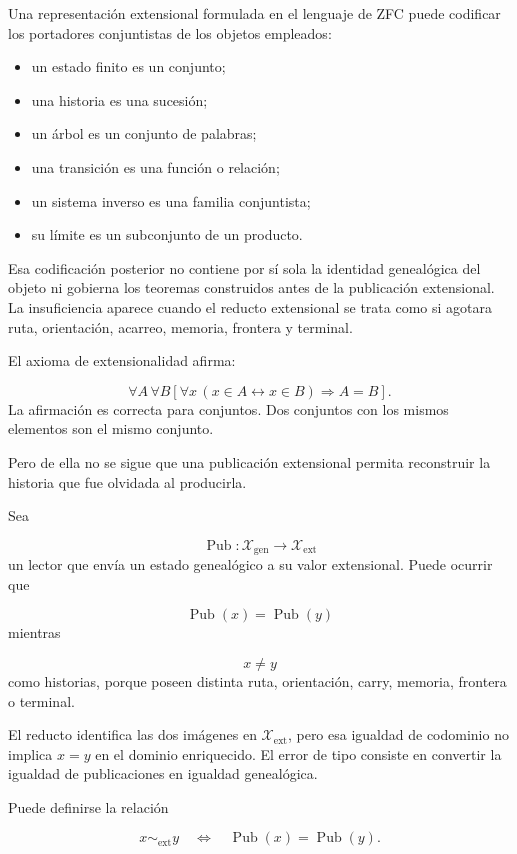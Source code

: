 Una representación extensional formulada en el lenguaje de ZFC puede codificar los portadores conjuntistas de los objetos empleados:\par
\begin{itemize}
\item un estado finito es un conjunto;
\item una historia es una sucesión;
\item un árbol es un conjunto de palabras;
\item una transición es una función o relación;
\item un sistema inverso es una familia conjuntista;
\item su límite es un subconjunto de un producto.
\end{itemize}
Esa codificación posterior no contiene por sí sola la identidad genealógica del objeto ni gobierna los teoremas construidos antes de la publicación extensional. La insuficiencia aparece cuando el reducto extensional se trata como si agotara ruta, orientación, acarreo, memoria, frontera y terminal.\par
El axioma de extensionalidad afirma:\par
\[
\forall A\,\forall B
\left[
\forall x\,
(x\in A\leftrightarrow x\in B)
\Rightarrow A=B
\right].
\]
La afirmación es correcta para conjuntos. Dos conjuntos con los mismos elementos son el mismo conjunto.\par
Pero de ella no se sigue que una publicación extensional permita reconstruir la historia que fue olvidada al producirla.\par
Sea\par
\[
\operatorname{Pub}:
\mathscr X_{\mathrm{gen}}
\longrightarrow
\mathscr X_{\mathrm{ext}}
\]
un lector que envía un estado genealógico a su valor extensional. Puede ocurrir que\par
\[
\operatorname{Pub}(x)
=
\operatorname{Pub}(y)
\]
mientras\par
\[
x\neq y
\]
como historias, porque poseen distinta ruta, orientación, carry, memoria, frontera o terminal.\par
El reducto identifica las dos imágenes en \(\mathscr X_{\mathrm{ext}}\), pero esa igualdad de codominio no implica \(x=y\) en el dominio enriquecido. El error de tipo consiste en convertir la igualdad de publicaciones en igualdad genealógica.\par
Puede definirse la relación\par
\[
x\sim_{\mathrm{ext}}y
\quad\Longleftrightarrow\quad
\operatorname{Pub}(x)
=
\operatorname{Pub}(y).
\]

